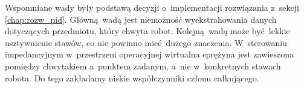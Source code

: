 Wspomniane wady były podstawą decyzji o~implementacji rozwiązania z~sekcji \ref{chap:rozw_pid}. Główną wadą jest niemożność wyekstrahowania danych dotyczących przedmiotu, który chwyta robot. Kolejną wadą może być lekkie usztywnienie stawów, co nie powinno mieć dużego znaczenia. W~sterowaniu impedancyjnym w~przestrzeni operacyjnej wirtualna sprężyna jest zawieszona pomiędzy chwytakiem a~punktem zadanym, a~nie w~konkretnych stawach robota. Do tego zakładamy niskie współczynniki członu całkującego.









